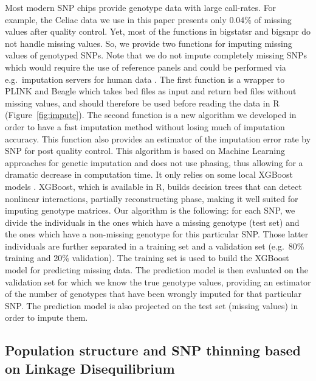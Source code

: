 \documentclass{bioinfo}
\begin{document}
\begin{methods}
{Most modern SNP chips provide genotype data with large call-rates. For example, the Celiac data we use in this paper presents only 0.04\% of missing values after quality control. Yet, most of the functions in bigstatsr and bigsnpr do not handle missing values.
So, we provide two functions for imputing missing values of genotyped SNPs. Note that we do not impute completely missing SNPs which would require the use of reference panels and could be performed via e.g.\ imputation servers for human data \cite[]{mccarthy2016reference}. 
The first function is a wrapper to PLINK and Beagle \cite[]{Browning2009} which takes bed files as input and return bed files without missing values, and should therefore be used before reading the data in R (Figure~\ref{fig:impute}). 
The second function is a new algorithm we developed in order to have a fast imputation method without losing much of imputation accuracy. This function also provides an estimator of the imputation error rate by SNP for post quality control.
This algorithm is based on Machine Learning approaches for genetic imputation \cite[]{Wang2012} and does not use phasing, thus allowing for a dramatic decrease in computation time. It only relies on some local XGBoost models \cite[]{Chen2016}. 
XGBoost, which is available in R, builds decision trees that can detect nonlinear interactions, partially reconstructing phase, making it well suited for imputing genotype matrices. 
Our algorithm is the following: for each SNP, we divide the individuals in the ones which have a missing genotype (test set) and the ones which have a non-missing genotype for this particular SNP. Those latter individuals are further separated in a training set and a validation set (e.g.\ 80\% training and 20\% validation). The training set is used to build the XGBoost model for predicting missing data. The prediction model is then evaluated on the validation set for which we know the true genotype values, providing an estimator of the number of genotypes that have been wrongly imputed for that particular SNP. The prediction model is also projected on the test set (missing values) in order to impute them.
}



\subsection{Population structure and SNP thinning based on Linkage Disequilibrium} 




\end{methods}
\end{document}
